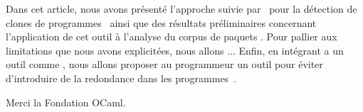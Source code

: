 Dans cet article, nous avons présenté l'approche suivie par~{\Asak} pour
la détection de clones de programmes~{\OCaml} ainsi que des résultats
préliminaires concernant l'application de cet outil à l'analyse du corpus de
paquets {\Opam}.
%
Pour pallier aux limitations que nous avons explicitées, nous allons ...
%
Enfin, en intégrant {\Asak} a un outil comme {\Merlin}, nous allons proposer
au programmeur un outil pour éviter d'introduire de la redondance dans
les programmes~{\OCaml}.

Merci la Fondation OCaml.
